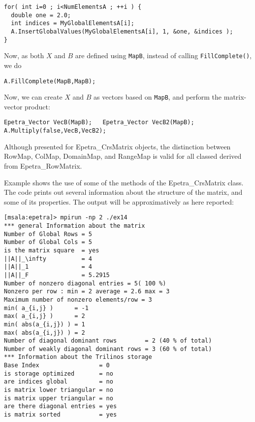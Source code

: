 \begin{verbatim}
for( int i=0 ; i<NumElementsA ; ++i ) {
  double one = 2.0;
  int indices = MyGlobalElementsA[i];
  A.InsertGlobalValues(MyGlobalElementsA[i], 1, &one, &indices );
}
\end{verbatim}
Now, as both $X$ and $B$ are defined using \verb!MapB!, instead of
calling \verb!FillComplete()!, we do
\begin{verbatim}
A.FillComplete(MapB,MapB);
\end{verbatim}
Now, we can create $X$ and $B$ as vectors based on \verb!MapB!, and
perform the matrix-vector product:
\begin{verbatim}
Epetra_Vector VecB(MapB);   Epetra_Vector VecB2(MapB);  
A.Multiply(false,VecB,VecB2);
\end{verbatim}  

\begin{remark}
Although presented for Epetra\_CrsMatrix objects, the distinction
between RowMap, ColMap, DomainMap, and RangeMap is valid for all classed
derived from Epetra\_RowMatrix. 
\end{remark}


\medskip

Example  shows the use of some of the methods of 
the Epetra\_CrsMatrix class. The code prints out several information
about the structure of the matrix, and some of its properties.
The output will be approximatively as here reported:
\begin{verbatim}
[msala:epetra]> mpirun -np 2 ./ex14
*** general Information about the matrix
Number of Global Rows = 5
Number of Global Cols = 5
is the matrix square  = yes
||A||_\infty          = 4
||A||_1               = 4
||A||_F               = 5.2915
Number of nonzero diagonal entries = 5( 100 %)
Nonzero per row : min = 2 average = 2.6 max = 3
Maximum number of nonzero elements/row = 3
min( a_{i,j} )      = -1
max( a_{i,j} )      = 2
min( abs(a_{i,j}) ) = 1
max( abs(a_{i,j}) ) = 2
Number of diagonal dominant rows        = 2 (40 % of total)
Number of weakly diagonal dominant rows = 3 (60 % of total)
*** Information about the Trilinos storage
Base Index                 = 0
is storage optimized       = no
are indices global         = no
is matrix lower triangular = no
is matrix upper triangular = no
are there diagonal entries = yes
is matrix sorted           = yes
\end{verbatim}

